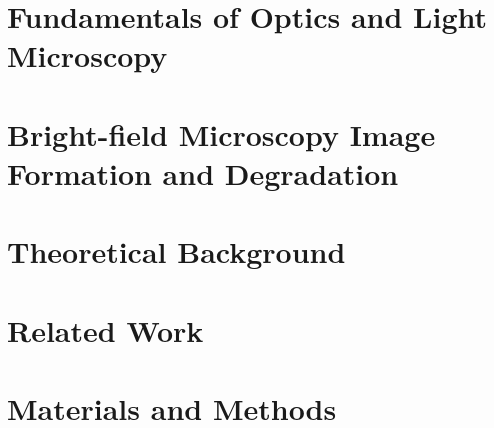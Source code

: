 \documentclass[mestrado, pre-defesa]{packages/icmc}
\begin{document}
\textual

% 

\chapter{Fundamentals of Optics and Light Microscopy}
\label{chapter:fundamentals-of-optics-and-light-microscopy}


\chapter{Bright-field Microscopy Image Formation and Degradation}
\label{chapter:blur-characterization-and-image-formation}


\chapter{Theoretical Background}
\label{chapter:theoretical-background}


\chapter{Related Work}
\label{chapter:related-work}


\chapter{Materials and Methods}
\label{chapter:materials-and-methods}



% 

% 
\end{document}
